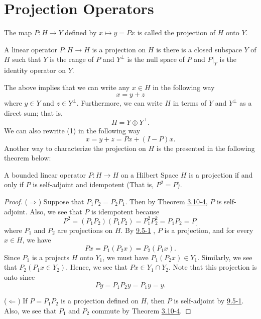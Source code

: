 \section{Projection Operators}

\begin{definition}[Projections]
    The map \( P : H \to Y  \) defined by \( x \mapsto y  = Px  \) is called the projection of \( H  \) onto \(  Y \).
\end{definition}

\begin{prop}
    A linear operator \( P : H \to H  \) is a projection on \( H  \) is there is a closed subspace \( Y  \) of \( H  \) such that \( Y  \) is the range of \( P  \) and \( Y^{\perp} \) is the null space of \( P \) and \( P |_{Y} \) is the identity operator on \( Y  \).
\end{prop}
The above implies that we can write any \( x \in H  \) in the following way
\[  x = y + z  \tag{1} \]
where \( y \in Y  \) and \( z \in Y^{\perp} \). Furthermore, we can write \( H  \) in terms of \( Y  \) and \( Y^{\perp} \) as a direct sum; that is,
\[  H = Y \oplus Y^{\perp}. \]
We can also rewrite (1) in the following way
\[  x = y + z = Px + (I-P)x. \]
Another way to characterize the projection on \( H  \) is the presented in the following theorem below:

\begin{theorem}[Projection]
    A bounded linear operator \( P: H \to H  \) on a Hilbert Space \( H  \) is a projection if and only if \( P  \) is self-adjoint and idempotent (That is, \( P^{2} = P  \)).
\end{theorem}

\begin{proof}
    (\( \Longrightarrow \)) Suppose that \( {P}_{1} {P}_{2} = {P}_{2} {P}_{1} \). Then by Theorem {\hyperref[3.10-4]{3.10-4}}, \( P \) is self-adjoint. Also, we see that \( P \) is idempotent because
    \[  P^{2} = ({P}_{1} {P}_{2})({P}_{1} {P}_{2}) = {P}_{1}^{2} {P}_{2}^{2} = {P}_{1} {P}_{2} = P ] \]
    where \( {P}_{1}  \) and \( {P}_{2}  \) are projections on \( H  \).
    By {\hyperref[9.5-1]{9.5-1}} , \( P  \) is a projection, and for every \( x \in H  \), we have 
    \[  Px = {P}_{1}({P}_{2}x) = {P}_{2}({P}_{1}x). \]
    Since \( {P}_{1}  \) is a projects \( H  \) onto \( {Y}_{1} \), we must have \( {P}_{1}({P}_{2}x) \in {Y}_{1} \). Similarly, we see that \( {P}_{2}({P}_{1}x \in {Y}_{2}) \). Hence, we see that \( Px \in {Y}_{1} \cap {Y}_{2} \). Note that this projection is onto since   
    \[  Py = {P}_{1} {P}_{2} y = {P}_{1} y = y.  \]

    (\( \Longleftarrow \)) If \( P = {P}_{1} {P}_{2}  \) is a projection defined on \( H  \), then \( P \) is self-adjoint by {\hyperref[9.5-1]{9.5-1}}. Also, we see that \( {P}_{1} \) and \( {P}_{2} \) commute by Theorem {\hyperref[3.10-4]{3.10-4}}.
\end{proof}

